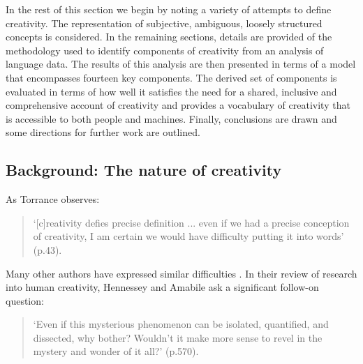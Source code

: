 \documentclass[10pt,letterpaper]{article}
\begin{document}

In the rest of this section we begin by noting a variety of attempts to define creativity. The representation of subjective, ambiguous, loosely structured concepts is considered.
In the remaining sections, details are provided of the methodology used to identify components of creativity from an analysis of language data. The results of this analysis are then presented in terms of a model that encompasses fourteen key components. The derived set of components is evaluated in terms of how well it satisfies the need for a shared, inclusive and comprehensive account of creativity and provides a vocabulary of creativity that is accessible to both people and machines. Finally, conclusions are drawn and some directions for further work are outlined.

\subsection*{Background:  The nature of creativity} \label{background}

As Torrance observes:

\begin{quote}
`[c]reativity defies precise definition ... even if we had a precise conception of creativity, I am certain we would have difficulty putting it into words' \cite{torrance88} (p.43). 
\end{quote}

Many other authors have expressed similar difficulties \cite{rhodes61,sternberg99a,kaufman09}. 
In their review of research into human creativity, Hennessey and Amabile ask a significant follow-on question: 
\begin{quote}
`Even if this mysterious phenomenon can be isolated, quantified, and dissected, why bother? Wouldn't it make more sense to revel in the mystery and wonder of it all?' 
\cite{hennessey10} (p.570).
\end{quote}
\end{document}
